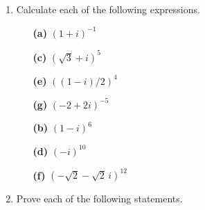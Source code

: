 {\begin{enumerate}
\vspace{2pt}        %
 
 
\bf\item\rm %
Calculate each of the following expressions.
 
 
\vspace{3pt}        %
 
\hspace{-7pt}
\begin{minipage}[t]{4.6in}
\noindent
\begin{minipage}[t]{2.25in}
\begin{itemize}
 
 \item[{\bf (a)}]
$(1+i)^{-1}$
 
 \item[{\bf (c)}]
$(\sqrt{3}+i)^{5}$
 
 \item[{\bf (e)}]
$((1-i)/2)^{4}$
 
 \item[{\bf (g)}]
$(-2+2i)^{-5}$
 
\end{itemize}
\end{minipage} \hfill
\begin{minipage}[t]{2.25in}
\begin{itemize}
 
 \item[{\bf (b)}]
$(1-i)^{6}$
 
 \item[{\bf (d)}]
$(-i)^{10}$
 
 \item[{\bf (f)}]
$(-\sqrt{2} - \sqrt{2}\, i)^{12}$
 
\end{itemize}
\end{minipage}
\end{minipage}
 
\vspace{2pt}        %
 
 
 
\bf\item\rm
Prove each of the following statements.
 
 
\vspace{3pt}        %
 
\hspace{-7pt}
\begin{minipage}[t]{4.6in}
\noindent
\begin{minipage}[t]{2.25in}
\begin{itemize}
 

\end{itemize}
\end{minipage}
\end{minipage}
\end{enumerate}}
